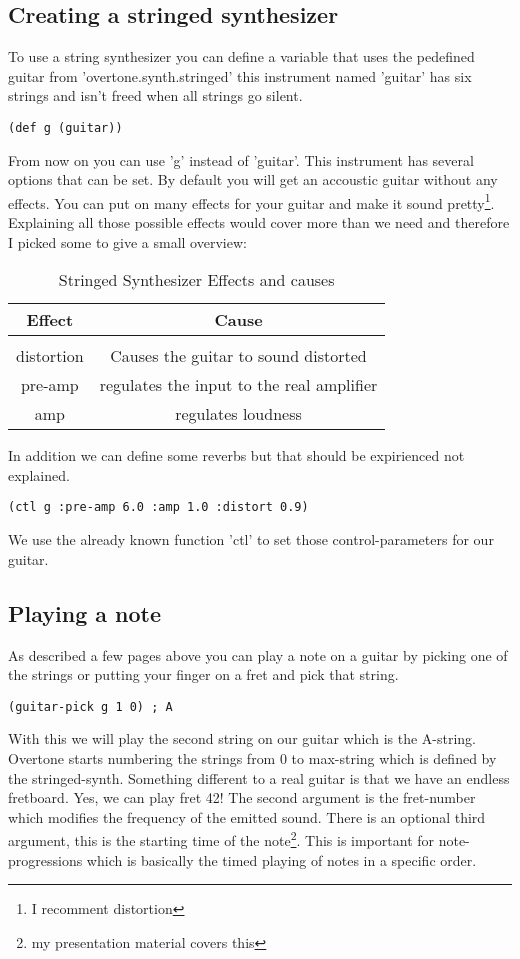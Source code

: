 \subsection{Creating a stringed synthesizer}
To use a string synthesizer you can define a variable that uses the pedefined guitar from 'overtone.synth.stringed' this instrument named 'guitar' has six strings and isn't freed when all strings go silent.
\begin{lstlisting}
(def g (guitar))
\end{lstlisting}
From now on you can use 'g' instead of 'guitar'. This instrument has several options that can be set.
By default you will get an accoustic guitar without any effects. You can put on many effects for your guitar and make it sound pretty\footnote{I recomment distortion}.
Explaining all those possible effects would cover more than we need and therefore I picked some to give a small overview:\\
\begin{table}[h]
\centering
\caption{Stringed Synthesizer Effects and causes}
\begin{tabular}{c|c}
	Effect & Cause\\
	\hline \\
	distortion & Causes the guitar to sound distorted \\
	pre-amp & regulates the input to the real amplifier \\
	amp & regulates loudness
\end{tabular}
\end{table}

In addition we can define some reverbs but that should be expirienced not explained.
\begin{lstlisting}
(ctl g :pre-amp 6.0 :amp 1.0 :distort 0.9)
\end{lstlisting}
We use the already known function 'ctl' to set those control-parameters for our guitar.

\subsection{Playing a note}
As described a few pages above you can play a note on a guitar by picking one of the strings or putting your finger on a fret and pick that string.
\begin{lstlisting}
(guitar-pick g 1 0) ; A
\end{lstlisting} 
With this we will play the second string on our guitar which is the A-string. Overtone starts numbering the strings from 0 to max-string which is defined by the stringed-synth. Something different to a real guitar is that we have an endless fretboard. Yes, we can play fret 42!
The second argument is the fret-number which modifies the frequency of the emitted sound.
There is an optional third argument, this is the starting time of the note\footnote{my presentation material covers this}. This is important for note-progressions which is basically the timed playing of notes in a specific order.

